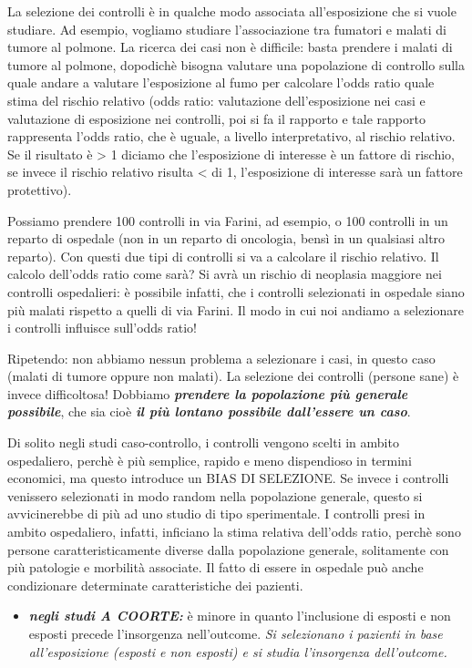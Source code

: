 La selezione dei controlli è in qualche modo associata all'esposizione che si vuole studiare. Ad esempio, vogliamo studiare l'associazione tra fumatori e malati di tumore al polmone. La ricerca dei casi non è difficile: basta prendere i malati di tumore al polmone, dopodichè bisogna valutare una popolazione di controllo sulla quale andare a valutare l'esposizione al fumo per calcolare l'odds ratio quale stima del rischio relativo (odds ratio: valutazione dell'esposizione nei casi e valutazione di esposizione nei controlli, poi si fa il rapporto e tale rapporto rappresenta l'odds ratio, che è uguale, a livello interpretativo, al rischio relativo. Se il risultato è > 1 diciamo che l'esposizione di interesse è un fattore di rischio, se invece il rischio relativo risulta < di 1, l'esposizione di
interesse sarà un fattore protettivo).

Possiamo prendere 100 controlli in via Farini, ad esempio, o 100 controlli in un reparto di ospedale (non in un reparto di oncologia, bensì in un qualsiasi altro reparto). Con questi due tipi di controlli si va a calcolare il rischio relativo. Il calcolo dell'odds ratio come sarà? Si avrà un rischio di neoplasia maggiore nei controlli ospedalieri: è possibile infatti, che i controlli selezionati in ospedale siano più malati rispetto a quelli di via Farini. Il modo in
cui noi andiamo a selezionare i controlli influisce sull'odds ratio!

Ripetendo: non abbiamo nessun problema a selezionare i casi, in questo caso (malati di tumore oppure non malati). La selezione dei controlli (persone sane) è invece difficoltosa! Dobbiamo \textbf{\emph{prendere la popolazione più generale possibile}}, che sia cioè \textbf{\emph{il più
lontano possibile dall'essere un caso}}.

Di solito negli studi caso-controllo, i controlli vengono scelti in ambito ospedaliero, perchè è più semplice, rapido e meno dispendioso in termini economici, ma questo introduce un BIAS DI SELEZIONE. Se invece i
controlli venissero selezionati in modo random nella popolazione
generale, questo si avvicinerebbe di più ad uno studio di tipo
sperimentale. I controlli presi in ambito ospedaliero, infatti,
inficiano la stima relativa dell'odds ratio, perchè sono persone
caratteristicamente diverse dalla popolazione generale, solitamente con
più patologie e morbilità associate. Il fatto di essere in ospedale può
anche condizionare determinate caratteristiche dei pazienti.

\begin{itemize}
\item
  \textbf{\emph{negli studi A COORTE:}} è minore in quanto l'inclusione
  di esposti e non esposti precede l'insorgenza nell'outcome. \emph{Si
  selezionano i pazienti in base all'esposizione (esposti e non esposti)
  e si studia l'insorgenza dell'outcome. }
\end{itemize}

